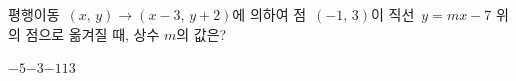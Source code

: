 평행이동~$(x,\,y)\longrightarrow(x-3,\,y+2)$에 의하여 점~$(-1,\,3)$이 직선~$y=mx-7$ 위의 점으로 옮겨질 때, 상수 $m$의 값은?
\begin{choices32}{$-5$}{$-3$}{$-1$}{$1$}{$3$}\end{choices32}

